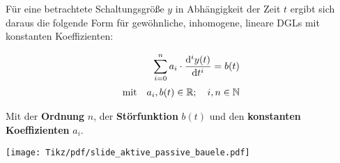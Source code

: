 \begin{frame}
{    Für eine betrachtete Schaltungsgröße $y$ in Abhängigkeit der Zeit $t$ ergibt sich daraus 
    die folgende Form für gewöhnliche, inhomogene, lineare DGLs mit konstanten Koeffizienten:

    \begin{align}\label{eq:grundlagen:dgl:inhomogen}
        \sum_{i=0}^{n} a_i \cdot \frac{\mathrm{d}^i y(t)}{\mathrm{d} t^i} = b(t)\\[2pt]\nonumber
        \text{mit} \quad a_i, b(t) \in \mathbb{R}; \quad i, n \in \mathbb{N}
    \end{align}

    Mit der \textbf{Ordnung} $n$, 
    der \textbf{Störfunktion} $b(t)$ und den \textbf{konstanten Koeffizienten} $a_i$. 

}%
\b{%
    \centering%
    \texttt{[image: Tikz/pdf/slide\_aktive\_passive\_bauele.pdf]}
}%
\end{frame}


